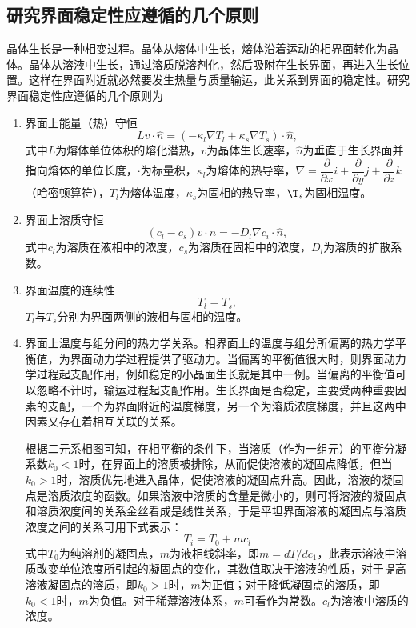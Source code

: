 \subsection{研究界面稳定性应遵循的几个原则}
晶体生长是一种相变过程。晶体从熔体中生长，熔体沿着运动的相界面转化为晶体。晶体从溶液中生长，通过溶质脱溶剂化，然后吸附在生长界面，再进入生长位置。这样在界面附近就必然要发生热量与质量输运，此关系到界面的稳定性。研究界面稳定性应遵循的几个原则为

\begin{enumerate}[(1)] \itemsep -0.5ex
\item 界面上能量（热）守恒
\begin{equation}
Lv\cdot\hat{n}=(-\kappa_l\nabla T_l+\kappa_s\nabla T_s)\cdot\hat{n},
\end{equation}
式中$L$为熔体单位体积的熔化潜热，$v$为晶体生长速率，$\hat{n}$为垂直于生长界面并指向熔体的单位长度，$\cdot$为标量积，$\kappa_l$为熔体的热导率，$\nabla=\dfrac{\partial}{\partial x}i+\dfrac{\partial}{\partial y}j+\dfrac{\partial}{\partial z}k$（哈密顿算符），$T_l$为熔体温度，$\kappa_s$为固相的热导率，$\T_s$为固相温度。

\item 界面上溶质守恒
\begin{equation}
(c_l-c_s)v\cdot\hat{n}=-D_l\nabla c_i\cdot\hat{n},
\end{equation}
式中$c_l$为溶质在液相中的浓度，$c_s$为溶质在固相中的浓度，$D_l$为溶质的扩散系数。

\item 界面温度的连续性
\begin{equation}
T_l=T_s,
\end{equation}
$T_l$与$T_s$分别为界面两侧的液相与固相的温度。

\item 界面上温度与组分间的热力学关系。相界面上的温度与组分所偏离的热力学平衡值，为界面动力学过程提供了驱动力。当偏离的平衡值很大时，则界面动力学过程起支配作用，例如稳定的小晶面生长就是其中一例。当偏离的平衡值可以忽略不计时，输运过程起支配作用。生长界面是否稳定，主要受两种重要因素的支配，一个为界面附近的温度梯度，另一个为溶质浓度梯度，并且这两中因素又存在着相互关联的关系。

\qquad 根据二元系相图可知，在相平衡的条件下，当溶质（作为一组元）的平衡分凝系数$k_0<1$时，在界面上的溶质被排除，从而促使溶液的凝固点降低，但当$k_0>1$时，溶质优先地进入晶体，促使溶液的凝固点升高。因此，溶液的凝固点是溶质浓度的函数。如果溶液中溶质的含量是微小的，则可将溶液的凝固点和溶质浓度间的关系金丝看成是线性关系，于是平坦界面溶液的凝固点与溶质浓度之间的关系可用下式表示：
\begin{equation}
T_i=T_0+mc_l
\end{equation}
式中$T_0$为纯溶剂的凝固点，$m$为液相线斜率，即$m=dT/dc_1$，此表示溶液中溶质改变单位浓度所引起的凝固点的变化，其数值取决于溶液的性质，对于提高溶液凝固点的溶质，即$k_0>1$时，$m$为正值；对于降低凝固点的溶质，即$k_0<1$时，$m$为负值。对于稀薄溶液体系，$m$可看作为常数。$c_l$为溶液中溶质的浓度。


\end{enumerate}
